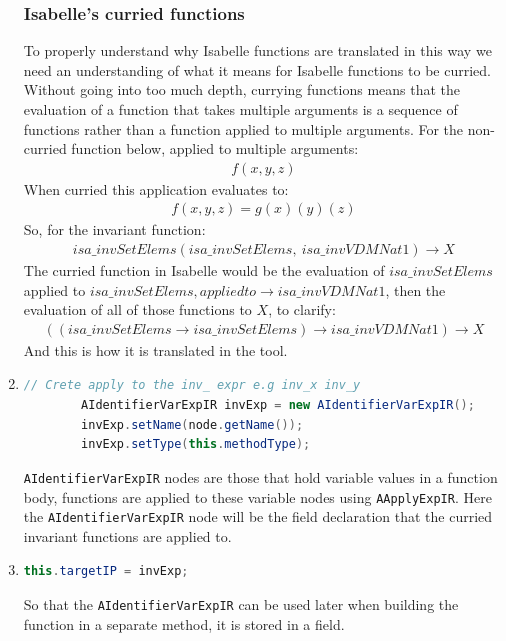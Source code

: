 \begin{enumerate}
		\subsubsection{Isabelle's curried functions} \label{icf}
		To properly understand why Isabelle functions are translated in this way we need an understanding of what it means for Isabelle functions to be curried. Without going into too much depth, currying functions means that the evaluation of a function that takes multiple arguments is a sequence of functions rather than a function applied to multiple arguments. For the non-curried function below, applied to multiple arguments:
		\begin{align}
		f(x,y,z)
		\end{align} 
		When curried this application evaluates to:
		\begin{align}
 		f(x,y,z) = g(x)(y)(z)
		\end{align} 
		So, for the invariant function:
		\begin{align}
		isa\_invSetElems(isa\_invSetElems,\:isa\_invVDMNat1) \to X
		\end{align}
		The curried function in Isabelle would be the evaluation of $isa\_invSetElems$ applied to $isa\_invSetElems, applied to \to isa\_invVDMNat1$, then the evaluation of all of those functions to $X$, to clarify:
		\begin{align}
		((isa\_invSetElems \to isa\_invSetElems) \to isa\_invVDMNat1) \to X
		\end{align}
		And this is how it is translated in the tool.
		\hfill\break
		\hfill\break
		\item \begin{lstlisting}[language=Java]
		// Crete apply to the inv_ expr e.g inv_x inv_y
        AIdentifierVarExpIR invExp = new AIdentifierVarExpIR();
        invExp.setName(node.getName());
        invExp.setType(this.methodType);
		\end{lstlisting}
		\lstinline[language=Java]{AIdentifierVarExpIR} nodes are those that hold variable values in a function body, functions are applied to these variable nodes using \lstinline[language=Java]{AApplyExpIR}. Here the \lstinline[language=Java]{AIdentifierVarExpIR} node will be the field declaration that the curried invariant functions are applied to.
		\item \begin{lstlisting}[language=Java]
		this.targetIP = invExp;
	    \end{lstlisting}
	    So that the \lstinline[language=Java]{AIdentifierVarExpIR} can be used later when building the function in a separate method, it is stored in a field.

\end{enumerate}
